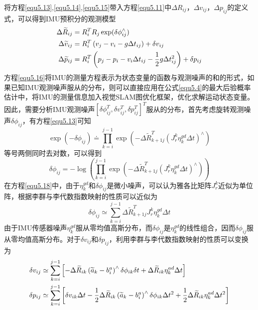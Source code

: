 将方程\ref{equ5.13},\ref{equ5.14},\ref{equ5.15}带入方程\ref{equ5.11}中$\Delta R_{ij}$，$\Delta v_{ij}$，$\Delta p_{ij}$的定义式，可以得到IMU预积分的观测模型
\begin{equation}
\label{equ5.16}
\begin{aligned}
\Delta \widetilde{R}_{ij} &= R_i^T R_j \exp(\delta \phi_{ij}^{\wedge}) \\ 
\Delta \widetilde{v}_{ij} &= R_i^T \left(v_j-v_i-g\Delta t_{ij} \right)+\delta v_{ij} \\
\Delta \widetilde{p}_{ij} &= R_i^T \left( p_j-p_i-v_i \Delta t_{ij} -{1 \over 2} g \Delta t_{ij}^2 \right) + \delta p_{ij}
\end{aligned}
\end{equation}
方程\ref{equ5.16}将IMU的测量方程表示为状态变量的函数与观测噪声的和的形式，如果已知IMU观测噪声服从的分布，则可以直接应用在公式\ref{equ5.4}的最大后验概率估计中，将IMU的测量信息加入视觉SLAM图优化框架，优化求解运动状态变量。因此，需要分析IMU观测噪声$[\delta \phi_{ij}^T,\delta v_{ij}^T,\delta p_{ij}^T]^T$服从的分布，首先考虑旋转观测噪声$\delta \phi_{ij}$，有方程\ref{equ5.13}可知
\begin{equation}
\label{equ5.17}
\exp \left( -\delta \phi_{ij} \right) \doteq \prod\limits_{k=i}^{j-1} \exp \left( -\Delta \widetilde{R}_{k+1j}^T \left( J_r^k \eta_k^{gd} \Delta t \right)^{\wedge}  \right)
\end{equation}
等号两侧同时去对数，可以得到
\begin{equation}
\label{equ5.18}
\delta \phi_{ij} = -\log \left( \prod\limits_{k=i}^{j-1} \exp \left( -\Delta \widetilde{R}_{k+1j}^T \left( J_r^k \eta_k^{gd} \Delta t \right)^{\wedge}  \right) \right)
\end{equation}
在方程\ref{equ5.18}中，由于$\eta_k^{gd}$和$\delta \phi_{ij}$是微小噪声，可以认为雅各比矩阵$J_r^k$近似为单位阵，根据李群与李代数指数映射的性质可以近似为
\begin{equation}
\label{equ5.19}
\delta \phi_{ij} \simeq \sum\limits_{k=i}^{j-1} \Delta \widetilde{R}_{k+1j}^T  J_r^k \eta_k^{gd} \Delta t
\end{equation}
由于IMU传感器噪声$\eta_k^{gd}$服从零均值高斯分布，而$\delta \phi_{ij}$是$\eta_k^{gd}$的线性组合，因而$\delta \phi_{ij}$服从零均值高斯分布。对于$\delta v_{ij}$和$\delta p_{ij}$，利用李群与李代数指数映射的性质可以变换为
\begin{equation}
\label{equ5.20}
\begin{aligned}
\delta v_{ij} &\simeq \sum\limits_{k=i}^{j-1} \left[ - \Delta \widetilde{R}_{ik} \left( \widetilde{a}_k - b_i^a  \right) ^{\wedge} \delta \phi_{ik} \delta t + \Delta \widetilde{R}_{ik} \eta_k^{ad} \Delta t   \right] \\ 
\delta p_{ij} &\simeq \sum\limits_{k=i}^{j-1} \left[ \delta v_{ik} \Delta t -{1 \over 2} \Delta \widetilde{R}_{ik} \left( \widetilde{a}_k - b_i^a  \right) ^{\wedge} \delta \phi_{ik} \Delta t^2 + { 1 \over 2} \Delta \widetilde{R}_{ik} \eta_k^{ad} \Delta t^2 \right]
\end{aligned}
\end{equation}

